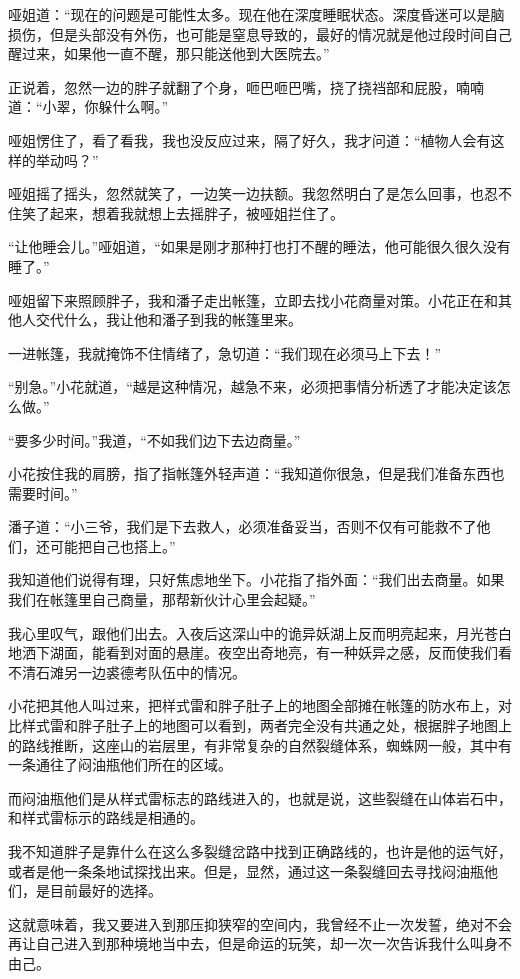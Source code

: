 哑姐道：“现在的问题是可能性太多。现在他在深度睡眠状态。深度昏迷可以是脑损伤，但是头部没有外伤，也可能是窒息导致的，最好的情况就是他过段时间自己醒过来，如果他一直不醒，那只能送他到大医院去。”

正说着，忽然一边的胖子就翻了个身，咂巴咂巴嘴，挠了挠裆部和屁股，喃喃道：“小翠，你躲什么啊。”

哑姐愣住了，看了看我，我也没反应过来，隔了好久，我才问道：“植物人会有这样的举动吗？”

哑姐摇了摇头，忽然就笑了，一边笑一边扶额。我忽然明白了是怎么回事，也忍不住笑了起来，想着我就想上去摇胖子，被哑姐拦住了。

“让他睡会儿。”哑姐道，“如果是刚才那种打也打不醒的睡法，他可能很久很久没有睡了。”

哑姐留下来照顾胖子，我和潘子走出帐篷，立即去找小花商量对策。小花正在和其他人交代什么，我让他和潘子到我的帐篷里来。

一进帐篷，我就掩饰不住情绪了，急切道：“我们现在必须马上下去！”

“别急。”小花就道，“越是这种情况，越急不来，必须把事情分析透了才能决定该怎么做。”

“要多少时间。”我道，“不如我们边下去边商量。”

小花按住我的肩膀，指了指帐篷外轻声道：“我知道你很急，但是我们准备东西也需要时间。”

潘子道：“小三爷，我们是下去救人，必须准备妥当，否则不仅有可能救不了他们，还可能把自己也搭上。”

我知道他们说得有理，只好焦虑地坐下。小花指了指外面：“我们出去商量。如果我们在帐篷里自己商量，那帮新伙计心里会起疑。”

我心里叹气，跟他们出去。入夜后这深山中的诡异妖湖上反而明亮起来，月光苍白地洒下湖面，能看到对面的悬崖。夜空出奇地亮，有一种妖异之感，反而使我们看不清石滩另一边裘德考队伍中的情况。

小花把其他人叫过来，把样式雷和胖子肚子上的地图全部摊在帐篷的防水布上，对比样式雷和胖子肚子上的地图可以看到，两者完全没有共通之处，根据胖子地图上的路线推断，这座山的岩层里，有非常复杂的自然裂缝体系，蜘蛛网一般，其中有一条通往了闷油瓶他们所在的区域。

而闷油瓶他们是从样式雷标志的路线进入的，也就是说，这些裂缝在山体岩石中，和样式雷标示的路线是相通的。

我不知道胖子是靠什么在这么多裂缝岔路中找到正确路线的，也许是他的运气好，或者是他一条条地试探找出来。但是，显然，通过这一条裂缝回去寻找闷油瓶他们，是目前最好的选择。

这就意味着，我又要进入到那压抑狭窄的空间内，我曾经不止一次发誓，绝对不会再让自己进入到那种境地当中去，但是命运的玩笑，却一次一次告诉我什么叫身不由己。


